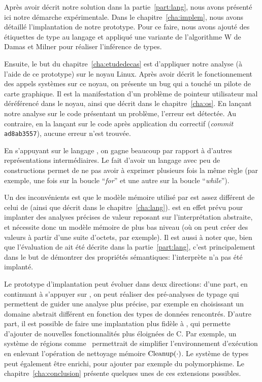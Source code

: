 Après avoir décrit notre solution dans la partie~\ref{part:lang}, nous avons
présenté ici notre démarche expérimentale. Dans le chapitre~\ref{cha:implem},
nous avons détaillé l'implantation de notre prototype. Pour ce faire, nous avons
ajouté des étiquettes de type au langage \newspeak et appliqué une variante de
l'algorithme W de Damas et Milner pour réaliser l'inférence de types.

Ensuite, le but du chapitre~\ref{cha:etudedecas} est d'appliquer notre analyse
(à l'aide de ce prototype) sur le noyau Linux. Après avoir décrit le
fonctionnement des appels systèmes sur ce noyau, on présente un bug qui a touché
un pilote de carte graphique. Il est la manifestation d'un problème de pointeur
utilisateur mal déréférencé dans le noyau, ainsi que décrit dans le
chapitre~\ref{cha:os}. En lançant notre analyse sur le code présentant un
problème, l'erreur est détectée. Au contraire, en la lançant sur le code après
application du correctif (\emph{commit} \texttt{ad8ab3557}), aucune erreur n'est
trouvée.

En s'appuyant sur le langage \newspeak, on gagne beaucoup par rapport à d'autres
représentations intermédiaires. Le fait d'avoir un langage avec peu de
constructions permet de ne pas avoir à exprimer plusieurs fois la même règle
(par exemple, une fois sur la boucle \enquote{\emph{for}} et une autre sur la
boucle \enquote{\emph{while}}).

Un des inconvénients est que le modèle mémoire utilisé par \newspeak est assez
différent de celui de \langname (ainsi que décrit dans le
chapitre~\ref{cha:lang}). \newspeak est en effet prévu pour implanter des
analyses précises de valeur reposant sur l'interprétation abstraite, et
nécessite donc un modèle mémoire de plus bas niveau (où on peut créer des
valeurs à partir d'une suite d'octets, par exemple). Il est aussi à noter que,
bien que l'évaluation de \langname ait été décrite dans la
partie~\ref{part:lang}, c'est principalement dans le but de démontrer des
propriétés sémantiques: l'interprète n'a pas été implanté.

Le prototype d'implantation peut évoluer dans deux directions: d'une part, en
continuant à s'appuyer sur \newspeak, on peut réaliser des pré-analyses de
typage qui permettent de guider une analyse plus précise, par exemple en
choisissant un domaine abstrait différent en fonction des types de données
rencontrés. D'autre part, il est possible de faire une implantation plus fidèle
à \langname, qui permette d'ajouter de nouvelles fonctionnalités plus éloignées
de C. Par exemple, un système de régions comme~\cite{jfp92} permettrait de
simplifier l'environnement d'exécution en enlevant l'opération de nettoyage
mémoire $\mathrm{Cleanup}(\cdot)$. Le système de types peut également être enrichi, pour
ajouter par exemple du polymorphisme. Le chapitre~\ref{cha:conclusion} présente
quelques unes de ces extensions possibles.

